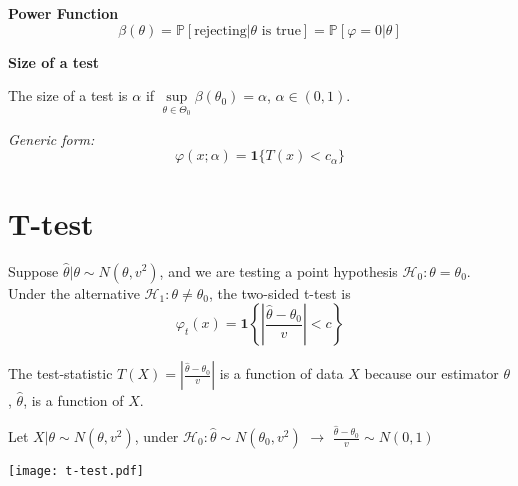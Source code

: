 \begin{definition}
    \textbf{Power Function}
    \[ \beta (\theta) = \mathbb{P} [\text{rejecting} | \theta \text{ is} \text{ true}] = \mathbb{P} [\varphi = 0 | \theta] \]
\end{definition}

\begin{definition}
    \textbf{Size of a test}
    
    The size of a test is $\alpha$ if $\underset{\theta \in \Theta_0}{\sup} \beta (\theta_0) = \alpha$, $\alpha \in (0, 1)$.
\end{definition}

\textit{Generic form:}
\[ \varphi (x ; \alpha) = \mathbf{1} \{ T (x) < c_{\alpha} \} \]

\section{T-test}

\begin{definition}
    Suppose $\hat{\theta} | \theta \sim N (\theta, v^2)$, and we are testing a point hypothesis $\mathcal{H}_0 : \theta = \theta_0$. Under the alternative $\mathcal{H}_1 : \theta \neq \theta_0$, the two-sided t-test is
    \[ \varphi_t (x) = \mathbf{1} \left\{ \left| \frac{\hat{\theta} - \theta_0}{v} \right| < c \right\} \]
\end{definition}

\begin{note}
    The test-statistic $T (X) = \left| \frac{\hat{\theta} - \theta_0}{v} \right|$ is a function of data $X$ because our estimator $\theta$, $\hat{\theta}$, is a function of $X$.
\end{note}

\begin{eg}
    Let $X | \theta \sim N (\theta, v^2)$, under $\mathcal{H}_0 : \hat{\theta} \sim N (\theta_0, v^2)$ $\rightarrow$ $\frac{\hat{\theta} - \theta_0}{v} \sim N (0, 1)$
\end{eg}

\texttt{[image: t-test.pdf]}

